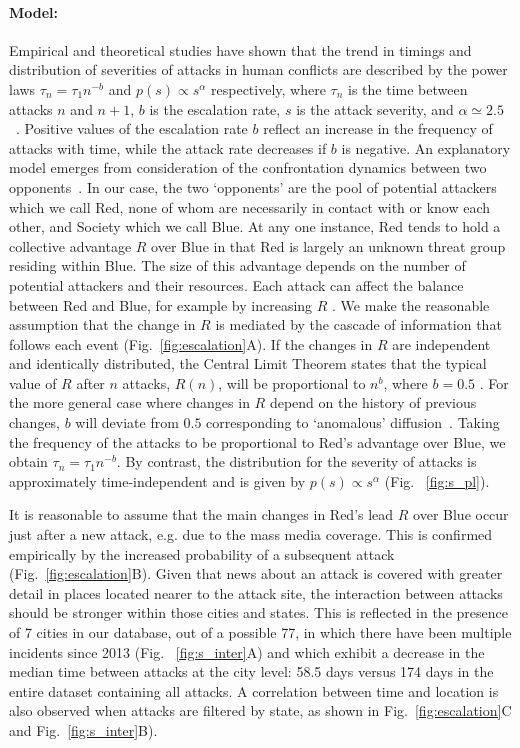\paragraph*{Model:}
Empirical and theoretical studies have shown that the trend in timings
and distribution of severities of attacks in human conflicts are
described by the power laws $\tau_n = \tau_1 n^{-b}$ and $p(s) \propto
s^\alpha$ respectively,
where $\tau_n$ is the time between attacks $n$ and $n+1$, 
$b$ is the escalation rate, 
$s$ is the attack severity,
and $\alpha \simeq 2.5$~\cite{Johnson2011a,Johnson2013b}.
Positive values of the escalation rate $b$ reflect an increase in the
frequency of attacks with time, while the attack rate decreases if $b$
is negative. 
An explanatory model emerges from consideration of the confrontation
dynamics between two opponents~\cite{Johnson2011a}. 
In our case, the two `opponents' are the pool of potential attackers
which we call Red, none of whom are necessarily in contact with or
know each other, and Society which we call Blue. 
At any one instance, Red tends to hold a collective advantage $R$ over
Blue in that Red is largely an unknown threat group residing within
Blue. 
The size of this advantage depends on the number of potential
attackers and their resources. Each attack can affect the balance
between Red and Blue, for example by increasing $R$
\cite{Johnson2011a,Johnson2013b}. 
We make the reasonable assumption that the change in $R$ is mediated
by the cascade of information that follows each event
(Fig.~\ref{fig:escalation}A). 
If the changes in $R$ are independent and identically distributed, the
Central Limit Theorem states that the typical value of $R$ after $n$
attacks, $R(n)$, will be proportional to $n^b$, where $b = 0.5$
\cite{Rudnick2010}. For the more general case where changes in $R$
depend on the history of previous changes, $b$ will deviate from $0.5$
corresponding to `anomalous' diffusion~\cite{Klafter1987}. Taking the
frequency of the attacks to be proportional to Red's advantage over
Blue, we obtain $\tau_n = \tau_1 n^{-b}$. By contrast, the
distribution for the severity of attacks is approximately
time-independent and is given by $p(s) \propto s^\alpha$ (Fig.~
\ref{fig:s_pl}). 

It is reasonable to assume that the main changes in Red's lead $R$
over Blue occur just after a new attack, e.g. due to the mass media
coverage. This is confirmed empirically by the increased probability
of a subsequent attack (Fig.~\ref{fig:escalation}B). Given that news
about an attack is covered with greater detail in places located
nearer to the attack site, the interaction between attacks should be
stronger within those cities and states. This is reflected in the
presence of 7 cities in our database, out of a possible 77, in which
there have been multiple incidents since 2013 (Fig.~
\ref{fig:s_inter}A) and which exhibit a decrease in the median time
between attacks at the city level: 58.5 days versus 174 days in the
entire dataset containing all attacks. A correlation between time and
location is also observed when attacks are filtered by state, as shown
in Fig.~\ref{fig:escalation}C and Fig.~\ref{fig:s_inter}B).

